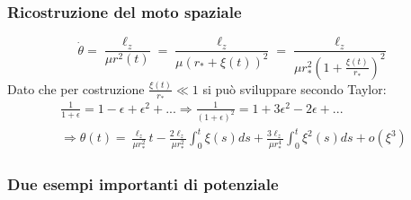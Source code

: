 \documentclass[Main.tex]{subfiles}
\begin{document}
	\subsubsection*{Ricostruzione del moto spaziale}
	
	\begin{equation}
		\dot \theta = \frac{\ell_z}{\mu r^2(t)} = \frac{\ell_z}{\mu ( r_* + \xi(t))^2} = \frac{\ell_z}{ \mu r_*^2\left(1 + \frac{\xi(t)}{r_*}\right)^2}
	\end{equation}
	Dato che per costruzione $\frac{\xi(t)}{r_*} \ll 1$ si può sviluppare secondo Taylor: 
	\begin{gather}
		\frac{1}{1+ \epsilon} = 1- \epsilon + \epsilon^2 + ... \Rightarrow \frac{1}{(1+ \epsilon)^2} = 1 + 3 \epsilon^2 - 2 \epsilon +...\\
		\Rightarrow \boxed{\theta(t) = \frac{\ell_z}{\mu r_*^2}t - \frac{2 \ell_z}{\mu r_*^2}\int_0^t \xi(s) ds + \frac{3 \ell_z}{\mu r_*^4}\int_0^t \xi ^2(s) ds + o(\xi^3)}
	\end{gather}


\newpage
\subsubsection{Due esempi importanti di potenziale}
\end{document}
